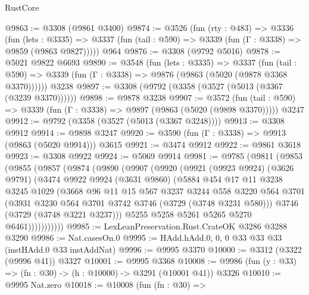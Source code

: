 \begin{lexlean}{RustCore}
\begin{coremodule}
@9863 := @3308 (@9861 @3400)
@9874 := @3526
    (fun (rty : @483) =>
    @3336
      (fun (lets : @3335) =>
      @3337 (fun (tail : @590) => @3339 (fun (Γ : @3338) => @9859 (@9863 @9827)))))
    @964
@9876 := @3308 (@9792 @5016)
@9878 := @5021 @9822 @6693
@9890 := @3548
    (fun (lets : @3335) =>
    @3337
      (fun (tail : @590) => @3339 (fun (Γ : @3338) => @9876 (@9863 (@5020 (@9878 @3368 @3370))))))
    @3238
@9897 := @3308 (@9792 (@3358 (@3527 (@5013 (@3367 (@3239 @3370))))))
@9898 := @9878 @3238
@9907 := @3572
    (fun (tail : @590) => @3339 (fun (Γ : @3338) => @9897 (@9863 (@5020 (@9898 @3370)))))
    @3247
@9912 := @9792 (@3358 (@3527 (@5013 (@3367 @3248))))
@9913 := @3308 @9912
@9914 := @9898 @3247
@9920 := @3590 (fun (Γ : @3338) => @9913 (@9863 (@5020 @9914))) @3615
@9921 := @3474 @9912
@9922 := @9861 @3618
@9923 := @3308 @9922
@9924 := @5069 @9914
@9981 := @9785
    (@9811
      (@9853
        (@9855
          (@9857
            (@9874
              (@9890
                (@9907
                  (@9920
                    (@9921
                      (@9923 @9924)
                      (@3626 @9791)
                      (@3474
                        @9922
                        @9924
                        (@3631 @9860)
                        (@5884
                          @454
                          @17
                          @11
                          @3238
                          @3245
                          @1029
                          (@3668
                            @96
                            @11
                            @15
                            @567
                            @3237
                            @3244
                            @558
                            @3220
                            @564
                            @3701
                            (@3931 @3230 @564 @3701 @3742 @3746 (@3729 (@3748 @3231 @580)))
                            @3746
                            (@3729 (@3748 @3221 @3237)))
                          @5255
                          @5258
                          @5261
                          @5265
                          @5270
                          @6461)))))))))))
@9985 := LexLeanPreservation.Rust.CrateOK @3286 @3288 @3290
@9986 := Nat.casesOn.{0}
@9995 := HAdd.hAdd.{0, 0, 0} @33 @33 @33 (instHAdd.{0} @33 instAddNat)
@9996 := @9995 @3370
@10000 := @3312 (@3322 (@9996 @41)) @3327
@10001 := @9995 @3368
@10008 := @9986 (fun (y : @33) => (fn : @30) -> (h : @10000) -> @3291 (@10001 @41)) @3326
@10010 := @9995 Nat.zero
@10018 := @10008
    (fun (fn : @30) =>

\end{coremodule}
\end{lexlean}
